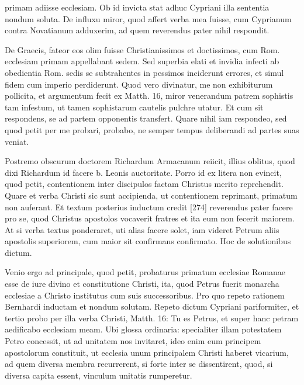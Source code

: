 primam adiisse ecclesiam. Ob id invicta stat adhuc Cypriani illa sententia nondum soluta. De influxu miror, quod affert verba mea fuisse, cum Cyprianum contra Novatianum adduxerim, ad quem reverendus pater nihil respondit.

De Graecis, fateor eos olim fuisse Christianissimos et doctissimos, cum Rom. ecclesiam primam appellabant sedem. Sed superbia elati et invidia infecti ab obedientia Rom. sedis se subtrahentes in pessimos inciderunt errores, et simul fidem cum imperio perdiderunt. Quod vero divinatur, me non exhibiturum pollicita, et argumentum fecit ex Matth. 16, miror venerandum patrem sophistis tam infestum, ut tamen sophistarum cautelis pulchre utatur. Et cum sit respondens, se ad partem opponentis transfert. Quare nihil iam respondeo, sed quod petit per me probari, probabo, ne semper tempus deliberandi ad partes suas veniat.

Postremo obscurum doctorem Richardum Armacanum reiicit, illius oblitus, quod dixi Richardum id facere b. Leonis auctoritate. Porro id ex litera non evincit, quod petit, contentionem inter discipulos factam Christus merito reprehendit. Quare et verba Christi sic sunt accipienda, ut contentionem reprimant, primatum non auferant. Et textum posterius inductum credit [274] reverendus pater facere pro se, quod Christus apostolos vocaverit fratres et ita eum non fecerit maiorem. At si verba textus ponderaret, uti alias facere solet, iam videret Petrum aliis apostolis superiorem, cum maior sit confirmans confirmato. Hoc de solutionibus dictum.

Venio ergo ad principale, quod petit, probaturus primatum ecclesiae Romanae esse de iure divino et constitutione Christi, ita, quod Petrus fuerit monarcha ecclesiae a Christo institutus cum suis successoribus. Pro quo repeto rationem Bernhardi inductam et nondum solutam. Repeto dictum Cypriani pariformiter, et tertio probo per illa verba Christi, Matth. 16: Tu es Petrus, et super hanc petram aedificabo ecclesiam meam. Ubi glossa ordinaria: specialiter illam potestatem Petro concessit, ut ad unitatem nos invitaret, ideo enim eum principem apostolorum constituit, ut ecclesia unum principalem Christi haberet vicarium, ad quem diversa membra recurrerent, si forte inter se dissentirent, quod, si diversa capita essent, vinculum unitatis rumperetur.

